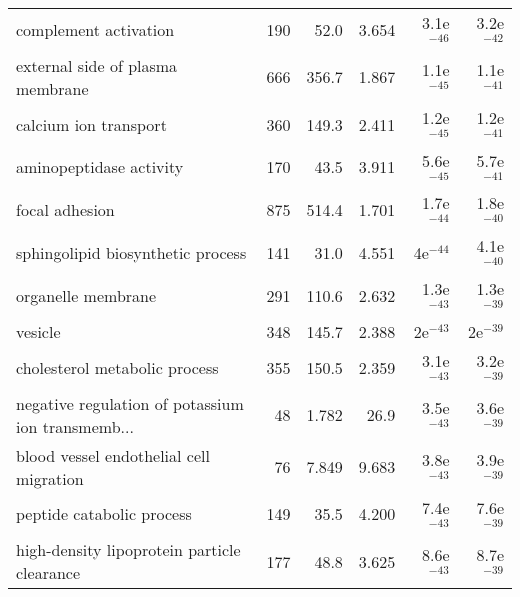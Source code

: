 \begin{longtable}{lrrrrr}
                             complement activation &                     190 &                    52.0 &      3.654 &         3.1e$^{-46}$ &         3.2e$^{-42}$ \\
                  external side of plasma membrane &                     666 &                   356.7 &      1.867 &         1.1e$^{-45}$ &         1.1e$^{-41}$ \\
                             calcium ion transport &                     360 &                   149.3 &      2.411 &         1.2e$^{-45}$ &         1.2e$^{-41}$ \\
                           aminopeptidase activity &                     170 &                    43.5 &      3.911 &         5.6e$^{-45}$ &         5.7e$^{-41}$ \\
                                    focal adhesion &                     875 &                   514.4 &      1.701 &         1.7e$^{-44}$ &         1.8e$^{-40}$ \\
                 sphingolipid biosynthetic process &                     141 &                    31.0 &      4.551 &           4e$^{-44}$ &         4.1e$^{-40}$ \\
                                organelle membrane &                     291 &                   110.6 &      2.632 &         1.3e$^{-43}$ &         1.3e$^{-39}$ \\
                                           vesicle &                     348 &                   145.7 &      2.388 &           2e$^{-43}$ &           2e$^{-39}$ \\
                     cholesterol metabolic process &                     355 &                   150.5 &      2.359 &         3.1e$^{-43}$ &         3.2e$^{-39}$ \\
 negative regulation of potassium ion transmemb... &                      48 &                   1.782 &       26.9 &         3.5e$^{-43}$ &         3.6e$^{-39}$ \\
           blood vessel endothelial cell migration &                      76 &                   7.849 &      9.683 &         3.8e$^{-43}$ &         3.9e$^{-39}$ \\
                         peptide catabolic process &                     149 &                    35.5 &      4.200 &         7.4e$^{-43}$ &         7.6e$^{-39}$ \\
       high-density lipoprotein particle clearance &                     177 &                    48.8 &      3.625 &         8.6e$^{-43}$ &         8.7e$^{-39}$ \\

\end{longtable}
